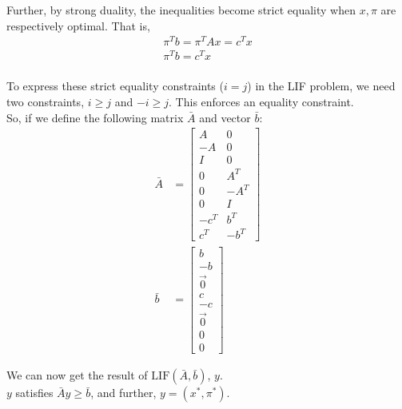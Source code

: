 \documentclass[12pt]{article}
\begin{document}
\begin{enumerate}
\begin{enumerate}
        Further, by strong duality, the inequalities become strict equality
        when $x, \pi$ are respectively optimal. That is,
        \begin{equation}
          \begin{split}
            \pi^Tb=\pi^TAx=c^Tx\\
            \pi^Tb=c^Tx\\
          \end{split}
        \end{equation}

        To express these strict equality constraints ($i=j$) in the LIF
        problem, we need two constraints, $i\geq j$ and $-i\geq j$. This
        enforces an equality constraint.\\

        So, if we define the following matrix $\bar{A}$ and vector $\bar{b}$:
        \begin{equation}
          \begin{split}
            \bar{A}&=
              \begin{bmatrix*}
                A & 0 \\
                -A & 0 \\
                I & 0 \\
                0 & A^T \\
                0 & -A^T \\
                0 & I \\
                -c^T & b^T \\
                c^T & -b^T
              \end{bmatrix*}\\
            \bar{b}&=
              \begin{bmatrix*}
                b \\ -b \\ \vec{0} \\ c \\ -c \\ \vec{0} \\ 0 \\ 0
              \end{bmatrix*}
          \end{split}
        \end{equation}

        We can now get the result of $\text{LIF}(\bar{A},\bar{b})$, $y$.\\
        $y$ satisfies $\bar{A}y\geq\bar{b}$, and further, $y=(x^*,\pi^*)$.\\


\end{enumerate}
\end{enumerate}
\end{document}
